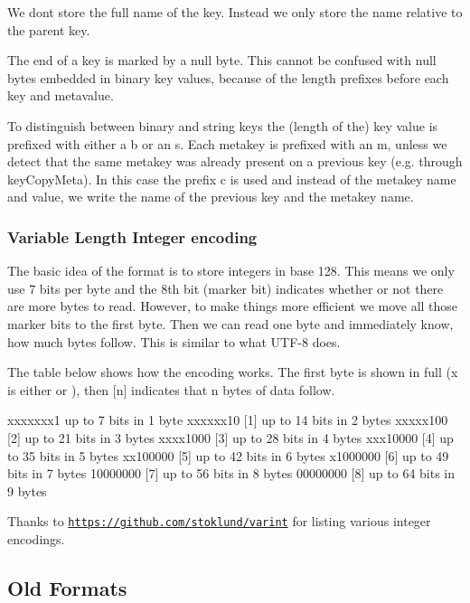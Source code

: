 We don\textquotesingle{}t store the full name of the key. Instead we only store the name relative to the parent key.

The end of a key is marked by a null byte. This cannot be confused with null bytes embedded in binary key values, because of the length prefixes before each key and metavalue.

To distinguish between binary and string keys the (length of the) key value is prefixed with either a {\ttfamily b} or an {\ttfamily s}. Each metakey is prefixed with an {\ttfamily m}, unless we detect that the same metakey was already present on a previous key (e.\+g. through {\ttfamily key\+Copy\+Meta}). In this case the prefix {\ttfamily c} is used and instead of the metakey name and value, we write the name of the previous key and the metakey name.

\subsubsection*{Variable Length Integer encoding}

The basic idea of the format is to store integers in base 128. This means we only use 7 bits per byte and the 8th bit (marker bit) indicates whether or not there are more bytes to read. However, to make things more efficient we move all those marker bits to the first byte. Then we can read one byte and immediately know, how much bytes follow. This is similar to what U\+T\+F-\/8 does.

The table below shows how the encoding works. The first byte is shown in full ({\ttfamily x} is either {} or {}), then {\ttfamily \mbox{[}n\mbox{]}} indicates that {\ttfamily n} bytes of data follow.


\begin{DoxyCode}
xxxxxxx1     up to  7 bits in 1 byte
xxxxxx10 [1] up to 14 bits in 2 bytes
xxxxx100 [2] up to 21 bits in 3 bytes
xxxx1000 [3] up to 28 bits in 4 bytes
xxx10000 [4] up to 35 bits in 5 bytes
xx100000 [5] up to 42 bits in 6 bytes
x1000000 [6] up to 49 bits in 7 bytes
10000000 [7] up to 56 bits in 8 bytes
00000000 [8] up to 64 bits in 9 bytes
\end{DoxyCode}


Thanks to \href{https://github.com/stoklund/varint}{\tt https\+://github.\+com/stoklund/varint} for listing various integer encodings.

\subsection*{Old Formats}

